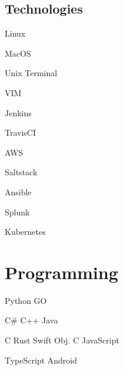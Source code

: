 \documentclass[]{cv}
\begin{document}
\begin{minipage}[t]{0.33\textwidth}
\subsection{Technologies}

\begin{tightemize}
	\item Linux
	\item MacOS
	\item Unix Terminal
	\item VIM
\end{tightemize}
\begin{tightemize}
	\item Jenkins
	\item TravisCI
	\item AWS
	\item Saltstack
	\item Ansible
	\item Splunk
	\item Kubernetes
\end{tightemize}
\sectionsep

\section{Programming}
Python \textbullet GO
\sectionsep	

C\# \textbullet C++ \textbullet Java
\sectionsep

C \textbullet Rust \textbullet Swift \textbullet Obj. C \textbullet JavaScript
\sectionsep

TypeScript \textbullet Android

\end{minipage} 
\hfill
\end{document}
